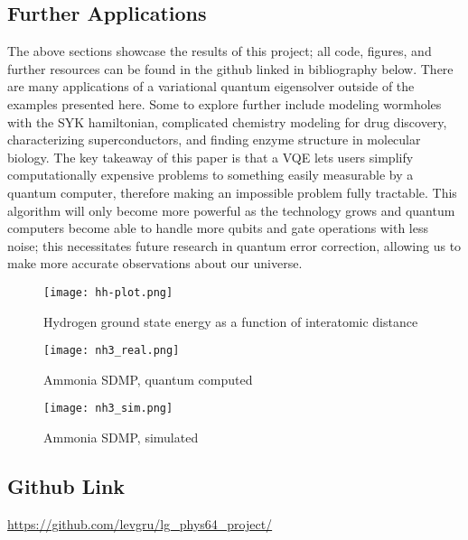 \documentclass[10pt,twocolumn,letterpaper]{article}
\begin{document}
\subsection{Further Applications}
The above sections showcase the results of this project; all code, figures, and further resources can be found in the github linked in bibliography below. There are many applications of a variational quantum eigensolver outside of the examples presented here. Some to explore further include modeling wormholes with the SYK hamiltonian, complicated chemistry modeling for drug discovery, characterizing superconductors, and finding enzyme structure in molecular biology. The key takeaway of this paper is that a VQE lets users simplify computationally expensive problems to something easily measurable by a quantum computer, therefore making an impossible problem fully tractable. This algorithm will only become more powerful as the technology grows and quantum computers become able to handle more qubits and gate operations with less noise; this necessitates future research in quantum error correction, allowing us to make more accurate observations about our universe. 

\begin{figure*}[t]
    \begin{minipage}{0.5\textwidth}
        \texttt{[image: hh-plot.png]}
        \caption{Hydrogen ground state energy as a function of interatomic distance}
        \label{2}
    \end{minipage}
    \begin{minipage}{0.5\textwidth}
        \texttt{[image: nh3\_real.png]}
        \caption{Ammonia SDMP, quantum computed}
        \label{3}
    \end{minipage}
\end{figure*}
\begin{figure*}[!]
    \texttt{[image: nh3\_sim.png]}
        \caption{Ammonia SDMP, simulated}
        \label{4}
\end{figure*}
\newpage
\subsection{Github Link}
\href{https://github.com/levgru/lg_phys64_project/}{https://github.com/levgru/lg\_phys64\_project/}



\end{document}
